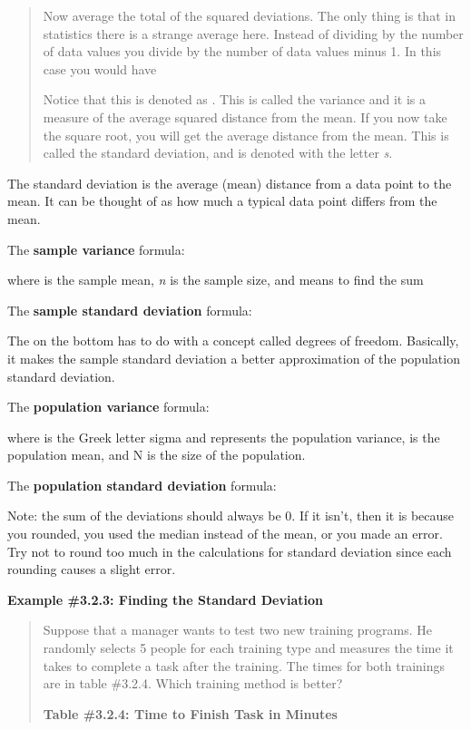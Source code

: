 \documentclass[]{book}
\begin{document}
\begin{quote}
Now average the total of the squared deviations. The only thing is
that in statistics there is a strange average here. Instead of
dividing by the number of data values you divide by the number of data
values minus 1. In this case you would have

Notice that this is denoted as . This is called the variance and it is
a measure of the average squared distance from the mean. If you now
take the square root, you will get the average distance from the mean.
This is called the standard deviation, and is denoted with the letter
\emph{s}.
\end{quote}

The standard deviation is the average (mean) distance from a data point
to the mean. It can be thought of as how much a typical data point
differs from the mean.

The \textbf{sample variance} formula:

where is the sample mean, \emph{n} is the sample size, and means to find the
sum

The \textbf{sample standard deviation} formula:

The on the bottom has to do with a concept called degrees of freedom.
Basically, it makes the sample standard deviation a better approximation
of the population standard deviation.

The \textbf{population variance} formula:

where is the Greek letter sigma and represents the population variance,
is the population mean, and N is the size of the population.

The \textbf{population standard deviation} formula:

Note: the sum of the deviations should always be 0. If it isn't, then it
is because you rounded, you used the median instead of the mean, or you
made an error. Try not to round too much in the calculations for
standard deviation since each rounding causes a slight error.

\textbf{Example \#3.2.3: Finding the Standard Deviation}

\begin{quote}
Suppose that a manager wants to test two new training programs. He
randomly selects 5 people for each training type and measures the time
it takes to complete a task after the training. The times for both
trainings are in table \#3.2.4. Which training method is better?

\textbf{Table \#3.2.4: Time to Finish Task in Minutes}
\end{quote}
\end{document}
